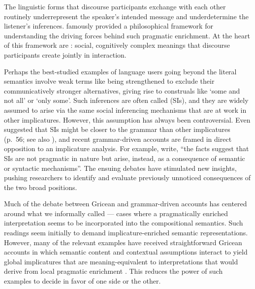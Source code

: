 \documentclass[leqno,12pt]{article}
\begin{document}
The linguistic forms that discourse participants exchange with each
other routinely underrepresent the speaker's intended message and
underdetermine the listener's inferences. \citet{Grice75} famously
provided a philosophical framework for understanding the driving
forces behind such pragmatic enrichment. At the heart of this
framework are : social, cognitively
complex meanings that discourse participants create jointly in
interaction.

Perhaps the best-studied examples of language users going beyond the
literal semantics involve weak terms like  being
strengthened to exclude their communicatively stronger alternatives,
giving rise to construals like `some and not all' or `only some'.
Such inferences are often called  (SIs), and they are widely assumed to arise via the
same social inferencing mechanisms that are at work in other
implicatures.  However, this assumption has always been
controversial. Even \citeauthor{Grice75} suggested that SIs might be
closer to the grammar than other implicatures (p.~56; see also
\citealt{Levinson00,Sperber95,Bach06}), and recent grammar-driven
accounts are framed in direct opposition to an implicature analysis.
For example,  write, ``the facts
suggest that SIs are not pragmatic in nature but arise, instead, as a
consequence of semantic or syntactic mechanisms''. The ensuing debates
have stimulated new insights, pushing researchers to identify and
evaluate previously unnoticed consequences of the two broad positions.

Much of the debate between Gricean and grammar-driven accounts has
centered around what we informally called 
--- cases where a pragmatically enriched interpretation seems to be
incorporated into the compositional semantics. Such readings seem
initially to demand implicature-enriched semantic representations.
However, many of the relevant examples have received straightforward
Gricean accounts in which semantic content and contextual assumptions
interact to yield global implicatures that are meaning-equivalent to
interpretations that would derive from local pragmatic enrichment
\citep{Russell06,Geurts09}. This reduces the power of such examples to
decide in favor of one side or the other.

\end{document}
